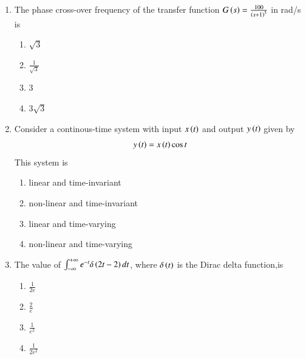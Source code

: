 \documentclass[journal,12pt,onecolumn]{IEEEtran}
\theoremstyle{remark}
\begin{document}
\begin{enumerate}
\begin{multicols}{4}
       \begin{enumerate}
           \item $\frac{1}{\sqrt{2}},-45\degree$
           \item $\frac{1}{\sqrt{2}},+45\degree$
           \item ${\sqrt{2}},+45\degree$
           \item ${\sqrt{2}},-45\degree$
       \end{enumerate}
   \end{multicols}
   \item The phase cross-over frequency of the transfer function $G\left(s\right) = \frac{100}{\left(s+1\right)^3}$ in rad/s is
   \begin{multicols}{4}
       \begin{enumerate}
           \item $\sqrt{3}$
           \item $\frac{1}{\sqrt{3}}$
           \item $3$
           \item $3\sqrt{3}$
       \end{enumerate}
   \end{multicols}
   \item Consider a continous-time system with input $x\left(t\right)$ and output $y\left(t\right)$ given by 
   \begin{align}
       y\left(t\right) = x\left(t\right)\cos{t}
   \end{align}
   This system is
   \begin{enumerate}
       \item linear and time-invariant
       \item non-linear and time-invariant
       \item linear and time-varying
       \item non-linear and time-varying\\
   \end{enumerate}
   \item The value of $\int_{-\infty}^{+\infty} e^{-t} \delta\left(2t-2\right)dt$, where $\delta \left(t\right)$ is the Dirac delta function,is
   \begin{multicols}{4}
       \begin{enumerate}
           \item $\frac{1}{2e}$
           \item $\frac{2}{e}$
           \item $\frac{1}{e^2}$
           \item $\frac{1}{2e^2}$
       \end{enumerate}

\end{multicols}
\end{enumerate}
\end{document}
